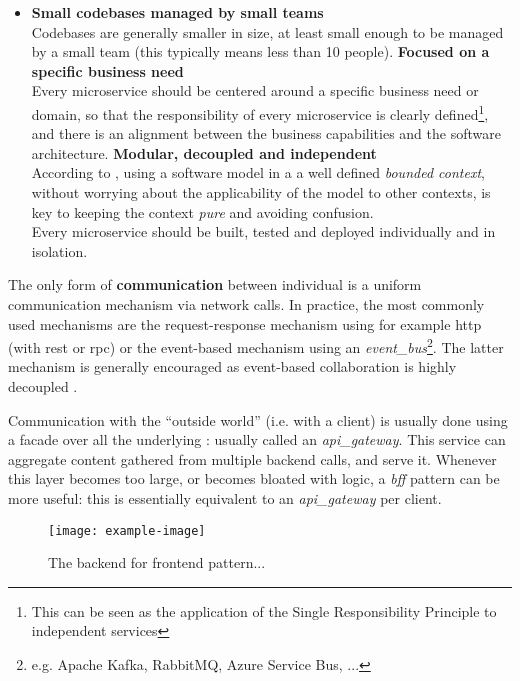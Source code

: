 \begin{itemize}
    \item \textbf{Small codebases managed by small teams}\\
    Codebases are generally smaller in size, at least small enough to be managed
    by a small team (this typically means less than 10 people).
    \spacedItem \textbf{Focused on a specific business need}\\
    Every \gls{microservice} should be centered around a specific business need
    or domain, so that the responsibility of every \gls{microservice} is clearly
    defined\footnote{This can be seen as the application of the Single
    Responsibility Principle to independent services}, and there is an alignment
    between the business capabilities and the software architecture. 
    \spacedItem \textbf{Modular, decoupled and independent}\\
    According to \textcite{Evans_2004}, using a software model in a a well
    defined \textit{bounded context}, without worrying about the applicability
    of the model to other contexts, is key to keeping the context \textit{pure}
    and avoiding confusion.\\
    Every \gls{microservice} should be built, tested and deployed
    individually and in isolation. 
\end{itemize}

The only form of \textbf{communication} between individual
 is a uniform communication mechanism via network calls.
In practice, the most commonly used mechanisms are the request-response
mechanism using for example \gls{http} (with \gls{rest} or \gls{rpc}) or the
event-based mechanism using an \textit{\gls{event_bus}}\footnote{e.g. Apache
Kafka, RabbitMQ, Azure Service Bus, ...}. The latter mechanism is generally
encouraged as event-based collaboration is highly decoupled
\autocite{Newman_2015}.

Communication with the ``outside world'' (i.e. with a client) is usually done
using a facade over all the underlying : usually called
an \textit{\gls{api_gateway}}. This service can aggregate content gathered from
multiple backend calls, and serve it. Whenever this layer becomes too large, or
becomes bloated with logic, a \textit{\gls{bff}} pattern can be more useful:
this is essentially equivalent to an \textit{\gls{api_gateway}} per client.


\begin{figure} %
    \centering
    \texttt{[image: example-image]}
    \caption[Backend for frontend pattern]{The backend for frontend pattern...}
\end{figure}


